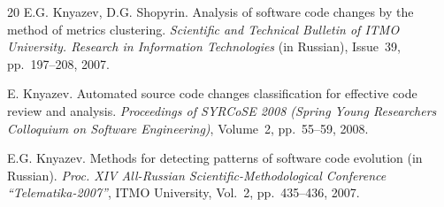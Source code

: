 \documentclass[11pt,a4paper]{article}
\begin{document}
\begin{thebibliography}{20}
E.G. Knyazev, D.G. Shopyrin.
Analysis of software code changes by the method of metrics clustering.
\textit{Scientific and Technical Bulletin of ITMO University. Research in Information Technologies} (in Russian), Issue~39, pp.~197--208, 2007.

E. Knyazev.
Automated source code changes classification for effective code review and analysis.
\textit{Proceedings of SYRCoSE 2008 (Spring Young Researchers Colloquium on Software Engineering)}, Volume~2, pp.~55--59, 2008.

E.G. Knyazev.
Methods for detecting patterns of software code evolution (in Russian).
\textit{Proc. XIV All-Russian Scientific-Methodological Conference ``Telematika-2007''}, ITMO University, Vol.~2, pp.~435--436, 2007.

\end{thebibliography}
\end{document}
